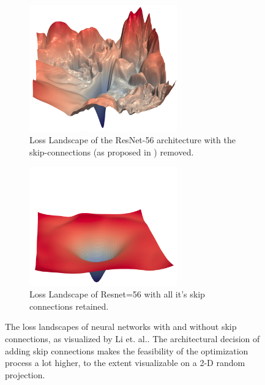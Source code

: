 \begin{figure}[ht]
    \centering
    \hfill
    \begin{subfigure}[b]{0.45\linewidth}
        \centering
        \includegraphics[width=0.7\textwidth]{figures/intro/landscape-rough.png}
        \caption{Loss Landscape of the ResNet-56 architecture with the skip-connections (as proposed in \cite{ml-resnet}) removed. \label{fig:loss-landscape-rough}}
    \end{subfigure}
    \hfill
    \begin{subfigure}[b]{0.45\linewidth}
        \centering
        \includegraphics[width=0.7\textwidth]{figures/intro/landscape-smooth.png}
        \caption{Loss Landscape of Resnet=56 with all it's skip connections retained.\label{fig:loss-landscape-smooth}}
    \end{subfigure}
    \hfill
    \caption[Loss Landscapes of Neural Networks]{The loss landscapes of neural networks with and without skip connections, as visualized by Li et. al.\cite{loss-landscapes}. The architectural decision of adding skip connections makes the feasibility of the optimization process a lot higher, to the extent visualizable on a 2-D random projection.}
    \label{fig:loss-landscape-neural-nets}
\end{figure}

